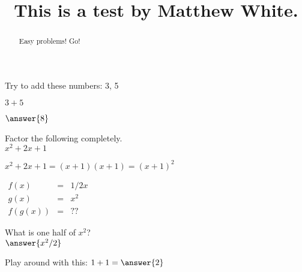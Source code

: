 \documentclass{ximera}
\title{This is a test by Matthew White.}
\begin{document}
	
	\begin{abstract}
		Easy problems! Go!
	\end{abstract}
	\maketitle
	
	
\begin{question}
	Try to add these numbers: 3, 5\\
	\begin{hint}
		$3 + 5$
		\end{hint}
	$\answer{8}$
\end{question}

	
  \begin{question}
  		Factor the following completely.\\
  		$ x^2 + 2x + 1 $ 
  		\begin{hint}
  			$ x^2 + 2x + 1 = (x + 1)(x + 1) = (x + 1)^2 $
  		\end{hint}
  		\begin{prompt}
  			\begin{multipleChoice}
  			\end{multipleChoice}
  		\end{prompt}
  \end{question}

	\begin{question}
		\begin{hint}
			$\begin{array}{rcl}f(x) & = & 1/2 x\\
			g(x) & = & x^2\\
			f(g(x)) & = & ??
			\end{array}$
			\end{hint}
		What is one half of $x^2$?\\
		$	\answer{x^2/2}$
	\end{question}

\begin{question}
Play around with this:
	$1 + 1 = \answer{2}$
	\end{question}
\end{document}
